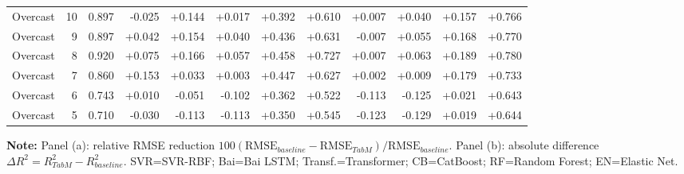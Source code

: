 \begin{table}[t]
\begin{tabular*}{\textwidth}{@{\extracolsep{\fill}}lrrrrrrrrrrr@{}}
Overcast & 10 & 0.897 & -0.025 & +0.144 & +0.017 & +0.392 & +0.610 & +0.007 & +0.040 & +0.157 & +0.766 \\
Overcast & 9 & 0.897 & +0.042 & +0.154 & +0.040 & +0.436 & +0.631 & -0.007 & +0.055 & +0.168 & +0.770 \\
Overcast & 8 & 0.920 & +0.075 & +0.166 & +0.057 & +0.458 & +0.727 & +0.007 & +0.063 & +0.189 & +0.780 \\
Overcast & 7 & 0.860 & +0.153 & +0.033 & +0.003 & +0.447 & +0.627 & +0.002 & +0.009 & +0.179 & +0.733 \\
Overcast & 6 & 0.743 & +0.010 & -0.051 & -0.102 & +0.362 & +0.522 & -0.113 & -0.125 & +0.021 & +0.643 \\
Overcast & 5 & 0.710 & -0.030 & -0.113 & -0.113 & +0.350 & +0.545 & -0.123 & -0.129 & +0.019 & +0.644 \\
\bottomrule
\end{tabular*}

\par\smallskip
\begin{minipage}{\textwidth}
\footnotesize
\textbf{Note:} Panel (a): relative RMSE reduction \(100(\mathrm{RMSE}_{baseline}-\mathrm{RMSE}_{TabM})/\mathrm{RMSE}_{baseline}\). Panel (b): absolute difference \(\Delta R^2=R^2_{TabM}-R^2_{baseline}\). SVR=SVR-RBF; Bai=Bai LSTM; Transf.=Transformer; CB=CatBoost; RF=Random Forest; EN=Elastic Net.
\end{minipage}

\end{table}
